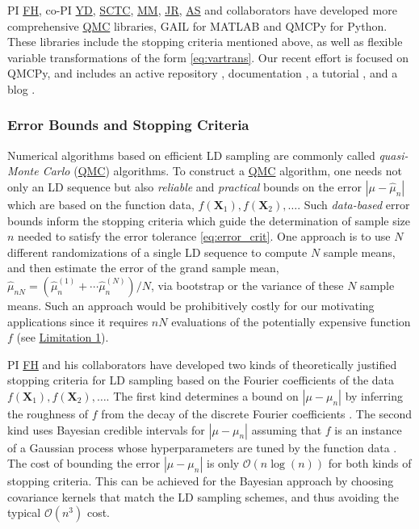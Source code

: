 \documentclass[11pt]{NSFamsart}
\newcommand{\FH}{\hyperlink{FHlink}{FH}\xspace}
\newcommand{\SCTC}{\hyperlink{SCTClink}{SCTC}\xspace}
\newcommand{\MM}{\hyperlink{MMlink}{MM}\xspace}
\newcommand{\YD}{\hyperlink{YDlink}{YD}\xspace}
\newcommand{\JR}{\hyperlink{JRlink}{JR}\xspace}
\newcommand{\AS}{\hyperlink{ASlink}{AS}\xspace}
\newcommand{\QMC}{\hyperlink{QMClink}{QMC}\xspace}
\newcommand{\Limone}{\hyperlink{Lim1link}{Limitation 1}\xspace}
\newcommand{\QMCPy}{QMCPy\xspace}
\newcommand{\MATLAB}{MATLAB\xspace}
\newcommand{\bX}{{\boldsymbol{X}}}
\def\abs#1{\ensuremath{\left \lvert #1 \right \rvert}}
\newcommand{\Order}{\mathcal{O}}
\newcommand{\hmu}{\hat{\mu}}
\begin{document}
PI \FH, co-PI \YD, \SCTC, \MM, \JR, \AS and collaborators have developed more comprehensive \QMC libraries, GAIL \cite{ChoEtal21a} for \MATLAB and \QMCPy \cite{QMCPy2020a} for Python.  These libraries include the stopping criteria mentioned above, as well as flexible variable transformations of the form \eqref{eq:vartrans}.  Our recent effort is focused on \QMCPy, and includes an active repository \cite{QMCPy2020a}, documentation \cite{QMCPyDocs}, a tutorial \cite{QMCPyTutMovie2020}, and a blog \cite{QMCBlog}.

\subsubsection{Error Bounds and Stopping Criteria} \label{sec:stopcrit}
Numerical algorithms based on efficient LD sampling are commonly called \hypertarget{QMClink}{\emph{quasi-Monte Carlo}} (\QMC) algorithms. To construct a \QMC algorithm, one needs not only an LD sequence but also \textit{reliable} and \textit{practical} bounds on the error $\abs{\mu - \hmu_n}$ which are based on the function data, $f(\bX_1), f(\bX_2), \ldots$.  Such \textit{data-based} error bounds inform the stopping criteria which guide the determination of sample size $n$ needed to satisfy the error tolerance \eqref{eq:error_crit}. One approach is to use $N$ different randomizations of a single LD sequence to compute $N$ sample means, and then estimate the error of the grand sample mean, $\hmu_{nN} = (\hmu_n^{(1)} +  \cdots \hmu_n^{(N)})/N$, via bootstrap or the variance of these $N$ sample means. Such an approach would be prohibitively costly for our motivating applications since it requires $nN$ evaluations of the potentially expensive function $f$ (see \Limone).

PI \FH and his collaborators have developed two kinds of theoretically justified stopping criteria for LD sampling based on the Fourier coefficients of the data $f(\bX_1), f(\bX_2), \ldots$.  The first kind determines a bound on $\abs{\mu-\mu_n}$ by inferring the roughness of $f$ from the decay of the discrete Fourier coefficients \cite{HicJim16a,JimHic16a,HicEtal17a}.  The second kind uses  Bayesian credible intervals for $\abs{\mu-\mu_n}$ assuming that $f$ is an instance of a Gaussian process whose hyperparameters are tuned by the function data \cite{HicJag18b,RatHic19a,JagHic22a}. The cost of bounding the error $\abs{\mu-\mu_n}$ is only $\Order(n \log(n))$ for both kinds of stopping criteria.  This can be achieved for the Bayesian approach by choosing covariance kernels that match the LD sampling schemes, and thus avoiding the typical $\Order(n^3)$ cost.
\end{document}
